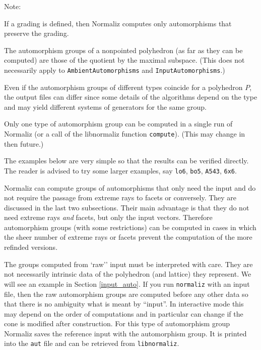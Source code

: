 Note:
\begin{arab}
\item If a grading is defined, then Normaliz computes only automorphisms that preserve the grading.

\item The automorphism groups of a nonpointed polyhedron (as far as they can be computed) are those of the quotient by the maximal subspace. (This does not necessarily apply to \verb|AmbientAutomorphisms| and \verb|InputAutomorphisms|.)
\item Even if the automorphism groups of different types coincide for a polyhedron $P$, the output files can differ since some details of the algorithms depend on the type and may yield different systems of generators for the same group.

\item Only one type of automorphism group can be computed in a single run of Normaliz (or a call of the libnormaliz function \verb|compute|). (This may change in then future.)
\end{arab}

The examples below are very simple so that the results can be verified directly. The reader is advised to try some larger examples, say \verb|lo6|, \verb|bo5|, \verb|A543|, \verb|6x6|.

Normaliz can compute groups of automorphisms that only need the input and do not require the passage from extreme rays to facets or conversely. They are discussed in the last two subsections. Their main advantage is that they do not need extreme rays \emph{and} facets, but only the input vectors. Therefore automorphism groups (with some restrictions) can be computed in cases in which the sheer number of extreme rays or facets prevent the computation of the more refinded versions.

The groups computed from `raw'' input must be interpreted with care. They are not necessarily intrinsic data of the polyhedron (and lattice) they represent. We will see an example in Section \ref{input_auto}. If you run \verb|normaliz| with an input file, then the raw automorphism groups are computed before any other data so that there is no ambiguity what is meant by ``input''. In interactive mode this may depend on the order of computations and in particular can change if the cone is modified after construction. For this type of automorphism group Normaliz saves the reference input with the automorphism group. It is printed into the \verb|aut| file and can be retrieved from \verb|libnormaliz|.

